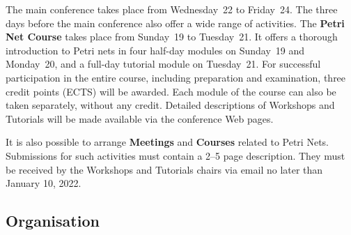 \documentclass[10pt,a4paper]{article}
\begin{document}
The main conference takes place from Wednesday~22 to Friday~24.
The three days before the main conference also offer a wide range of activities.
The {\bf Petri Net Course}
takes place from Sunday~19 to Tuesday~21.
It offers a thorough introduction to Petri nets in
four half-day modules on Sunday~19 and Monday~20, and a full-day tutorial module on Tuesday~21.
For successful participation in the entire course, including preparation and examination,
three credit points (ECTS) will be awarded. Each module of the course can also be
taken separately, without any credit.
Detailed descriptions of Workshops and Tutorials will be made available via the conference
Web pages.

It is also possible to arrange {\bf Meetings} and {\bf Courses} related to Petri Nets.
Submissions for such activities must contain a 2--5 page description. They must be
received by the Workshops and Tutorials chairs via email no later than January 10,
2022.

\subsection*{Organisation}
\end{document}
